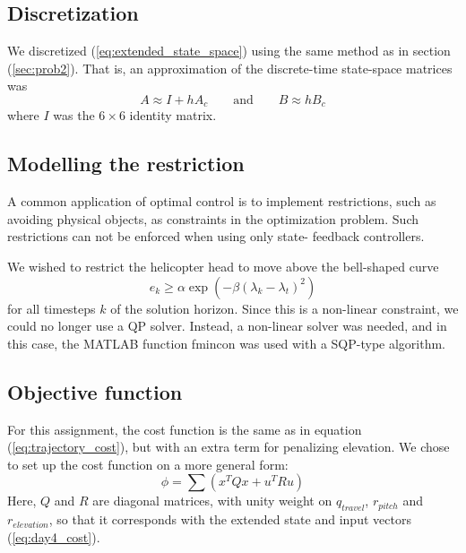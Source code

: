 \subsection{Discretization}
We discretized (\ref{eq:extended_state_space}) using the same method
as in section (\ref{sec:prob2}). That is, an approximation of the
discrete-time state-space matrices was
\begin{equation}
    A \approx I + hA_c
    \qquad\text{and}\qquad
    B \approx hB_c
\end{equation}
where $I$ was the $6\times6$ identity matrix.

\subsection{Modelling the restriction}
A common application of optimal control is to implement restrictions,
such as avoiding physical objects, as constraints in the optimization
problem. Such restrictions can not be enforced when using only state-
feedback controllers.

We wished to restrict the helicopter head to move above the bell-shaped curve
\begin{equation}
    e_k \geq \alpha \exp (-\beta (\lambda_k - \lambda_t)^2 )
\end{equation}
for all timesteps $k$ of the solution horizon. Since this is a non-linear constraint, we could no longer use a QP solver. Instead, a non-linear solver was needed, and in this case, the MATLAB function fmincon was used with a SQP-type algorithm.


\subsection{Objective function}
For this assignment, the cost function is the same as in equation (\ref{eq:trajectory_cost}), but with an extra term for penalizing elevation. We chose to set up the cost function on a more general form:
\begin{equation}
    \phi=\sum(x^{T}Qx+u^{T}Ru)
\end{equation}
Here, $Q$ and $R$ are diagonal matrices, with unity weight on $q_{travel}$, $r_{pitch}$ and $r_{elevation}$, so that it corresponds with the extended state and input vectors (\ref{eq:day4_cost}). %

